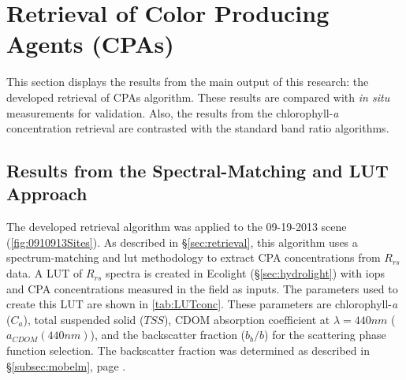\section{Retrieval of Color Producing Agents (CPAs)}
\label{sec:Results_CPAretrieval}
This section displays the results from the main output of this research: the developed retrieval of CPAs algorithm. These results are compared with {\it in situ} measurements for validation. Also, the results from the chlorophyll-{\it a} concentration retrieval are contrasted with the standard band ratio algorithms. 

\subsection{Results from the Spectral-Matching and LUT Approach}
\label{subsec:LUTapproach}
The developed retrieval algorithm \citep{Concha2013IGARSS} was applied to the 09-19-2013 scene (\autoref{fig:0910913Sites}). As described in \S\ref{sec:retrieval}, this algorithm uses a spectrum-matching and \gls{lut} methodology to extract CPA concentrations from $R_{rs}$ data. A LUT of $R_{rs}$ spectra is created in Ecolight (\S\ref{sec:hydrolight}) with \gls{iops} and CPA concentrations measured in the field as inputs. The parameters used to create this LUT are shown in \autoref{tab:LUTconc}. These parameters are chlorophyll-{\it a} ($C_a$), total suspended solid ($TSS$), CDOM absorption coefficient at $\lambda=440nm$ ($a_{CDOM}(440nm)$), and the backscatter fraction ($b_b/b$) for the scattering phase function selection. The backscatter fraction was determined as described in \S\ref{subsec:mobelm}, page \pageref{pag:phasefn}.

